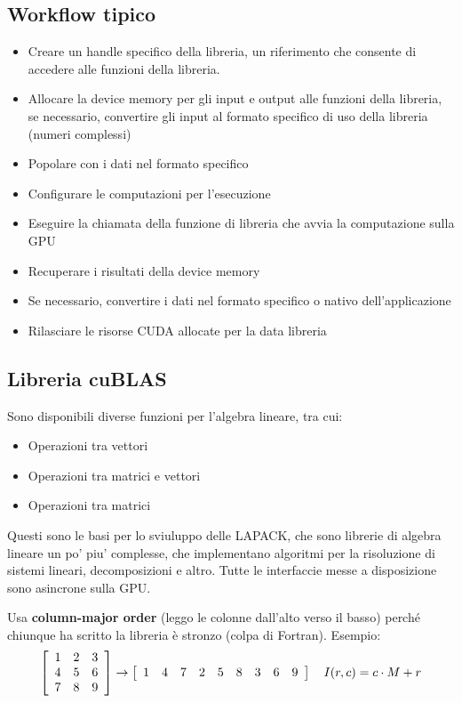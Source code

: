 \subsection{Workflow tipico}
\begin{itemize}
    \item Creare un handle specifico della libreria, un riferimento che consente di accedere alle funzioni della libreria.
    \item Allocare la device memory per gli input e output alle funzioni della libreria, se necessario, convertire gli input al formato specifico di uso della libreria (numeri complessi)
    \item Popolare con i dati nel formato specifico
    \item Configurare le computazioni per l'esecuzione
    \item Eseguire la chiamata della funzione di libreria che avvia la computazione sulla GPU
    \item Recuperare i risultati della device memory
    \item Se necessario, convertire i dati nel formato specifico o nativo dell'applicazione
    \item Rilasciare le risorse CUDA allocate per la data libreria
\end{itemize}

\subsection{Libreria cuBLAS}
Sono disponibili diverse funzioni per l'algebra lineare, tra cui:
\begin{itemize}
    \item Operazioni tra vettori
    \item Operazioni tra matrici e vettori
    \item Operazioni tra matrici
\end{itemize}

Questi sono le basi per lo sviuluppo delle LAPACK, che sono librerie di algebra lineare un po' piu' complesse, che implementano algoritmi per la risoluzione di sistemi lineari, decomposizioni e altro.
Tutte le interfaccie messe a disposizione sono asincrone sulla GPU.

Usa \textbf{column-major order} (leggo le colonne dall'alto verso il basso) perché chiunque ha scritto la libreria è stronzo (colpa di Fortran). Esempio: 
$$
\left[
\begin{array}{c c c}
	1 & 2 & 3 \\
	4 & 5 & 6 \\
	7 & 8 & 9
\end{array}
\right]
\rightarrow \left[\begin{array}{c c c c c c c c c}
	1 & 4 & 7 & 2 & 5 & 8 & 3 & 6  & 9
\end{array}\right]
\quad I(r,c) = c \cdot M  + r 
$$

